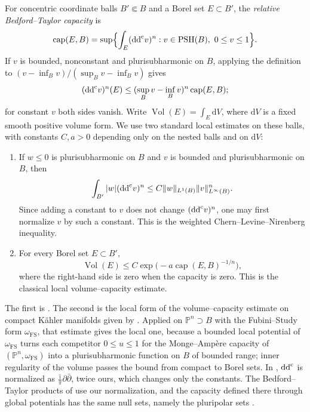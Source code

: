 For concentric coordinate balls $B'\Subset B$ and a Borel set $E\subset B'$, the \emph{relative Bedford--Taylor capacity} is
\[
 \operatorname{cap}(E,B)=\sup\Bigl\{\int_E(\mathrm{dd}^{\mathrm{c}} v)^n:v\in\mathrm{PSH}(B),\ 0\leq v\leq1\Bigr\}.
\]
If $v$ is bounded, nonconstant and plurisubharmonic on $B$, applying the definition to $(v-\inf_Bv)/(\sup_Bv-\inf_Bv)$ gives
\[
 (\mathrm{dd}^{\mathrm{c}} v)^n(E)\leq(\sup_Bv-\inf_Bv)^n\operatorname{cap}(E,B);
\]
for constant $v$ both sides vanish. Write $\operatorname{Vol}(E)=\int_E\mathrm{d}V$, where $\mathrm{d}V$ is a fixed smooth positive volume form. We use two standard local estimates on these balls, with constants $C,a>0$ depending only on the nested balls and on $\mathrm{d}V$:
\begin{enumerate}
\item If $w\leq0$ is plurisubharmonic on $B$ and $v$ is bounded and plurisubharmonic on $B$, then
\[
 \int_{B'}|w|(\mathrm{dd}^{\mathrm{c}} v)^n
 \leq C\|w\|_{L^1(B)}\|v\|_{L^\infty(B)}^n.
\]
Since adding a constant to $v$ does not change $(\mathrm{dd}^{\mathrm{c}} v)^n$, one may first normalize $v$ by such a constant. This is the weighted Chern--Levine--Nirenberg inequality.
\item For every Borel set $E\subset B'$,
\[
 \operatorname{Vol}(E)\leq C\exp\bigl(-a\operatorname{cap}(E,B)^{-1/n}\bigr),
\]
where the right-hand side is zero when the capacity is zero. This is the classical local volume--capacity estimate.
\end{enumerate}
The first is \cite[Theorem~3.14]{GZ17}. The second is the local form of the volume--capacity estimate on compact K\"ahler manifolds given by \cite[Lemma~12.2 and equation~(12.1.3) in the proof of Proposition~12.6]{GZ17}. Applied on $\mathbb P^n\supset B$ with the Fubini--Study form $\omega_{\mathrm{FS}}$, that estimate gives the local one, because a bounded local potential of $\omega_{\mathrm{FS}}$ turns each competitor $0\leq u\leq1$ for the Monge--Amp\`ere capacity of $(\mathbb P^n,\omega_{\mathrm{FS}})$ into a plurisubharmonic function on $B$ of bounded range; inner regularity of the volume passes the bound from compact to Borel sets. In \cite[Section~2.1.3]{GZ17}, $\mathrm{dd}^{\mathrm{c}}$ is normalized as $\frac{\mathrm i}{\pi}\partial\bar\partial$, twice ours, which changes only the constants. The Bedford--Taylor products of \cite[Section~2.1]{SGPT} use our normalization, and the capacity defined there through global potentials has the same null sets, namely the pluripolar sets \cite[Theorem~2.3.2]{SGPT}.

